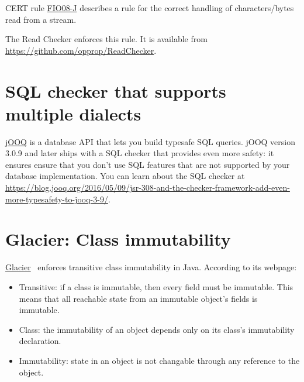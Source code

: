 CERT
rule \href{https://www.securecoding.cert.org/confluence/display/java/FIO08-J.+Distinguish+between+characters+or+bytes+read+from+a+stream+and+-1}{FIO08-J}
describes a rule for the correct handling of characters/bytes read
from a stream.

The Read Checker enforces this rule.
It is available from
\url{https://github.com/opprop/ReadChecker}.


\section{SQL checker that supports multiple dialects\label{sql-schecker}}

\href{http://www.jooq.org/}{jOOQ} is a database API that lets you build
typesafe SQL queries.  jOOQ version 3.0.9 and later ships with a SQL
checker that provides even more safety:  it ensures ensure that you don't
use SQL features that are not supported by your database
implementation.  You can learn about the SQL checker at
\url{https://blog.jooq.org/2016/05/09/jsr-308-and-the-checker-framework-add-even-more-typesafety-to-jooq-3-9/}.


\section{Glacier:  Class immutability\label{glacier-immutability-checker}}

\href{http://mcoblenz.github.io/Glacier/}{Glacier}~\cite{CoblenzNAMS2017}
enforces transitive class immutability in Java.  According to its webpage:

\begin{itemize}
\item
  Transitive: if a class is immutable, then every field must be
  immutable. This means that all reachable state from an immutable object's
  fields is immutable.
\item
  Class: the immutability of an object depends only on its class's
  immutability declaration.
\item
  Immutability: state in an object is not changable through any reference to
  the object.
\end{itemize}


